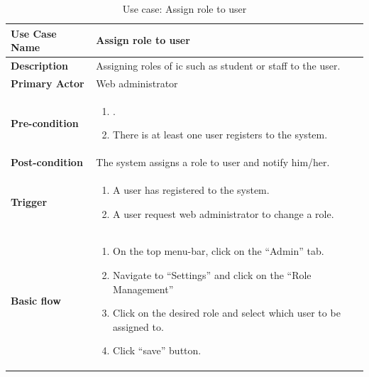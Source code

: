 \begin{table}
	\centering
	\caption{Use case: Assign role to user}
	\label{tbl:usecase-first}
	\begin{tabular}{|l|L{9cm}|}
		\hline
		\textbf{Use Case Name} & Assign role to user \\
		\hline
		
		\textbf{Description} & Assigning roles of \gls{ic} such as student or staff to the user. \\
		\textbf{Primary Actor} & Web administrator \\
		\textbf{Pre-condition} & 
		\begin{enumerate}
			\item \alreadylogin.
			\item There is at least one user registers to the system.
		\end{enumerate} \\
		\textbf{Post-condition} & The system assigns a role to user and notify him/her. \\
		\textbf{Trigger} & 
		\begin{enumerate}
			\item A user has registered to the system.
			\item A user request web administrator to change a role.
		\end{enumerate}\\
		\textbf{Basic flow} & 
		\begin{enumerate}
			\item On the top menu-bar, click on the \enquote{Admin} tab.
			\item Navigate to \enquote{Settings} and click on the \enquote{Role Management}
			\item Click on the desired role and select which user to be assigned to.
			\item Click \enquote{save} button.
		\end{enumerate} \\
		\hline
	\end{tabular}
\end{table}

